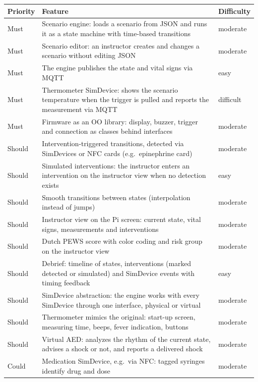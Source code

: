 \documentclass[11pt,a4paper]{article}
\begin{document}
\begin{table}[h]
\centering
\small
\begin{tabularx}{\linewidth}{@{}l X l@{}}
\toprule
\textbf{Priority} & \textbf{Feature} & \textbf{Difficulty} \\
\midrule
Must   & Scenario engine: loads a scenario from JSON and runs it as a state machine with time-based transitions & moderate \\
Must   & Scenario editor: an instructor creates and changes a scenario without editing JSON & moderate \\
Must   & The engine publishes the state and vital signs via MQTT & easy \\
Must   & Thermometer SimDevice: shows the scenario temperature when the trigger is pulled and reports the measurement via MQTT & difficult \\
Must   & Firmware as an OO library: display, buzzer, trigger and connection as classes behind interfaces & moderate \\
Should & Intervention-triggered transitions, detected via SimDevices or NFC cards (e.g.\ epinephrine card) & moderate \\
Should & Simulated interventions: the instructor enters an intervention on the instructor view when no detection exists & easy \\
Should & Smooth transitions between states (interpolation instead of jumps) & moderate \\
Should & Instructor view on the Pi screen: current state, vital signs, measurements and interventions & moderate \\
Should & Dutch PEWS score with color coding and risk group on the instructor view & moderate \\
Should & Debrief: timeline of states, interventions (marked detected or simulated) and SimDevice events with timing feedback & easy \\
Should & SimDevice abstraction: the engine works with every SimDevice through one interface, physical or virtual & moderate \\
Should & Thermometer mimics the original: start-up screen, measuring time, beeps, fever indication, buttons & moderate \\
Should & Virtual AED: analyzes the rhythm of the current state, advises a shock or not, and reports a delivered shock & moderate \\
Could  & Medication SimDevice, e.g.\ via NFC: tagged syringes identify drug and dose & moderate \\

\end{tabularx}
\end{table}
\end{document}

